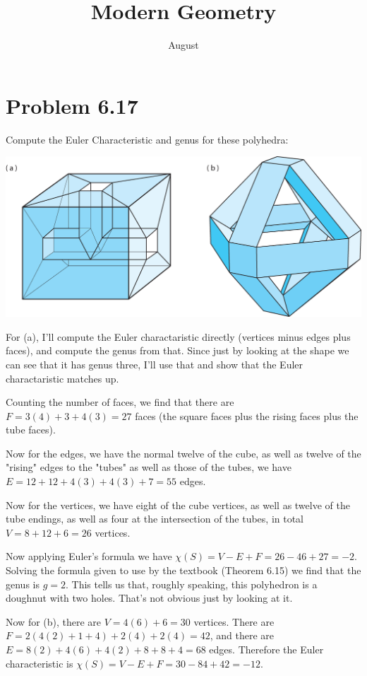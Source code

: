 \documentclass[12pt]{article}
\title{Modern Geometry}
\author{August}
\theoremstyle{definition}
\begin{document}
\maketitle

\section{Problem 6.17}

Compute the Euler Characteristic and genus for these polyhedra:

\includegraphics[scale=0.25]{Figure6-10.png} 

For (a), I'll compute the Euler charactaristic directly (vertices minus edges plus faces), and compute the genus from that. Since just by looking at the shape we can see that it has genus three, I'll use that and show that the Euler charactaristic matches up.

Counting the number of faces, we find that there are $F = 3(4) + 3 + 4(3) = 27$ faces (the square faces plus the  rising faces plus the tube faces).

Now for the edges, we have the normal twelve of the cube, as well as twelve of the "rising" edges to the "tubes" as well as those of the tubes, we have $E = 12 + 12 + 4(3) + 4(3) + 7 = 55$ edges.

Now for the vertices, we have eight of the cube vertices, as well as twelve of the tube endings, as well as four at the intersection of the tubes, in total $V = 8 + 12 + 6 = 26$ vertices.

Now applying Euler's formula we have $\chi(S) = V - E + F = 26 - 46 + 27 = -2$. Solving the formula given to use by the textbook (Theorem 6.15) we find that the genus is $g = 2$. This tells us that, roughly speaking, this polyhedron is a doughnut with two holes. That's not obvious just by looking at it.

Now for (b), there are $V = 4(6) + 6 = 30$ vertices. There are $F = 2( 4(2) + 1 + 4) + 2(4) + 2(4) = 42$, and there are $E = 8(2) + 4(6) + 4(2) + 8 + 8 + 4 = 68$ edges. Therefore the Euler characteristic is $\chi(S) = V - E + F = 30 - 84 + 42 = -12$.
\end{document}
